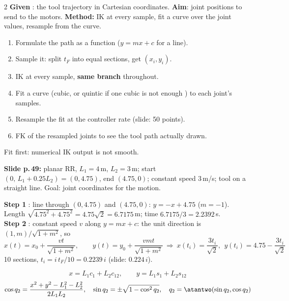 \begin{multicols}{2}
\nopagebreak[4]
\textbf{Given} : the tool trajectory in Cartesian coordinates. \textbf{Aim}: joint positions to send to the motors. \textbf{Method:} IK at every sample, fit a curve over the joint values, resample from the curve.
\begin{recipe}
\begin{enumerate}
\item Formulate the path as a function ($y=mx+c$ for a line).
\item Sample it: split $t_F$ into equal sections, get $(x_i,y_i)$.
\item IK at every sample, \textbf{same branch} throughout.
\item Fit a curve (cubic, or quintic if one cubic is not enough ) to each joint's samples.
\item Resample the fit at the controller rate (slide: 50 points).
\item FK of the resampled joints to see the tool path actually drawn.
\end{enumerate}
Fit first: numerical IK output is not smooth.
\end{recipe}
\begin{minipage}{0.4\linewidth}
\end{minipage}\hfill
\begin{minipage}{0.58\linewidth}
\small \textbf{Slide p.\,49:} planar RR, $L_1=4$\,m, $L_2=3$\,m; start $(0,\,L_1+0.25L_2)=(0,4.75)$, end $(4.75,0)$; constant speed $3$\,m/s; tool on a straight line. Goal: joint coordinates for the motion.
\end{minipage}
\par\textbf{Step 1} : line through $(0,4.75)$ and $(4.75,0)$: $y=-x+4.75$ ($m=-1$). Length $\sqrt{4.75^2+4.75^2}=4.75\sqrt2=6.7175$\,m; time $6.7175/3=2.2392$\,s.\\
\textbf{Step 2} : constant speed $v$ along $y=mx+c$: the unit direction is $(1,m)/\sqrt{1+m^2}$, so
\[x(t)=x_0+\frac{vt}{\sqrt{1+m^2}},\qquad y(t)=y_0+\frac{vmt}{\sqrt{1+m^2}}\ \Rightarrow\ x(t_i)=\frac{3t_i}{\sqrt2},\ \ y(t_i)=4.75-\frac{3t_i}{\sqrt2}\]
10 sections, $t_i=i\,t_F/10=0.2239\,i$ (slide: $0.224\,i$).
\begin{fbx}
\[x=L_1c_1+L_2c_{12},\qquad y=L_1s_1+L_2s_{12}\]
\[\cos q_2=\frac{x^2+y^2-L_1^2-L_2^2}{2L_1L_2},\quad \sin q_2=\pm\sqrt{1-\cos^2q_2},\quad q_2=\atantwo(\sin q_2,\cos q_2)\]

\end{fbx}
\end{multicols}
